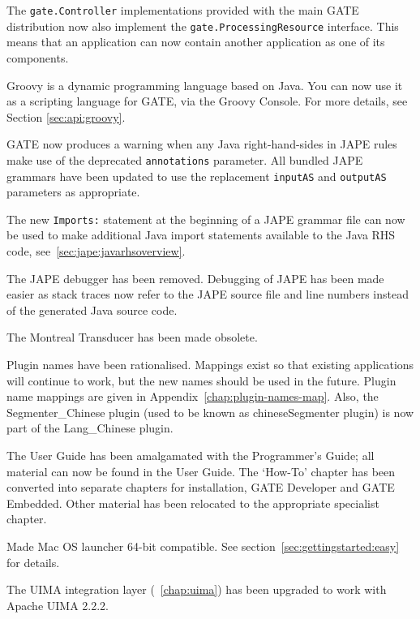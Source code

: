
The {\tt gate.Controller} implementations provided with the main GATE 
distribution now also implement the {\tt gate.ProcessingResource} interface.
This means that an application can now contain another application as one of
its components.


Groovy is a dynamic programming language based on Java. You can now use it as
a scripting language for GATE, via the Groovy Console. For more
details, see Section \ref{sec:api:groovy}.


GATE now produces a warning when any Java right-hand-sides in JAPE rules make
use of the deprecated {\tt annotations} parameter.  All bundled JAPE grammars
have been updated to use the replacement {\tt inputAS} and {\tt outputAS}
parameters as appropriate.

The new \verb|Imports:| statement at the beginning of a JAPE grammar file can
now be used to make additional Java import statements available to the Java RHS
code, see~\ref{sec:jape:javarhsoverview}.

The JAPE debugger has been removed. Debugging of JAPE has been made easier
as stack traces now refer to the JAPE source file and line numbers instead
of the generated Java source code.

The Montreal Transducer has been made obsolete.


Plugin names have been rationalised. Mappings exist so that existing
applications will continue to work, but the new names should be used in the
future. Plugin name mappings are given in Appendix~\ref{chap:plugin-names-map}.
Also, the Segmenter\_Chinese plugin (used to be known as chineseSegmenter
plugin) is now part of the Lang\_Chinese plugin.

The User Guide has been amalgamated with the
Programmer's Guide; all material can now be found in the User Guide. The
`How-To' chapter has been converted into separate chapters for
installation, GATE Developer and GATE Embedded. Other material has been
relocated to the appropriate specialist chapter.

Made Mac OS launcher 64-bit compatible.  See
section~\ref{sec:gettingstarted:easy} for details.

The UIMA integration layer (\Chapthing\ \ref{chap:uima}) has been upgraded to
work with Apache UIMA 2.2.2.

